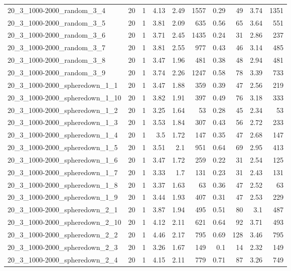 \begin{center}
\begin{scriptsize}
\begin{longtable}{lrrrrrrrrr}
20\_3\_1000-2000\_random\_3\_4 & 20 & 1 & 4.13 & 2.49 & 1557 & 0.29 & 49 & 3.74 & 1351\\
20\_3\_1000-2000\_random\_3\_5 & 20 & 1 & 3.81 & 2.09 & 635 & 0.56 & 65 & 3.64 & 551\\
20\_3\_1000-2000\_random\_3\_6 & 20 & 1 & 3.71 & 2.45 & 1435 & 0.24 & 31 & 2.86 & 237\\
20\_3\_1000-2000\_random\_3\_7 & 20 & 1 & 3.81 & 2.55 & 977 & 0.43 & 46 & 3.14 & 485\\
20\_3\_1000-2000\_random\_3\_8 & 20 & 1 & 3.47 & 1.96 & 481 & 0.38 & 48 & 2.94 & 481\\
20\_3\_1000-2000\_random\_3\_9 & 20 & 1 & 3.74 & 2.26 & 1247 & 0.58 & 78 & 3.39 & 733\\
20\_3\_1000-2000\_spheredown\_1\_1 & 20 & 1 & 3.47 & 1.88 & 359 & 0.39 & 47 & 2.56 & 219\\
20\_3\_1000-2000\_spheredown\_1\_10 & 20 & 1 & 3.82 & 1.91 & 397 & 0.49 & 76 & 3.18 & 333\\
20\_3\_1000-2000\_spheredown\_1\_2 & 20 & 1 & 3.25 & 1.64 & 53 & 0.28 & 45 & 2.34 & 53\\
20\_3\_1000-2000\_spheredown\_1\_3 & 20 & 1 & 3.53 & 1.84 & 307 & 0.43 & 56 & 2.72 & 233\\
20\_3\_1000-2000\_spheredown\_1\_4 & 20 & 1 & 3.5 & 1.72 & 147 & 0.35 & 47 & 2.68 & 147\\
20\_3\_1000-2000\_spheredown\_1\_5 & 20 & 1 & 3.51 & 2.1 & 951 & 0.64 & 69 & 2.95 & 413\\
20\_3\_1000-2000\_spheredown\_1\_6 & 20 & 1 & 3.47 & 1.72 & 259 & 0.22 & 31 & 2.54 & 125\\
20\_3\_1000-2000\_spheredown\_1\_7 & 20 & 1 & 3.33 & 1.7 & 131 & 0.23 & 31 & 2.43 & 131\\
20\_3\_1000-2000\_spheredown\_1\_8 & 20 & 1 & 3.37 & 1.63 & 63 & 0.36 & 47 & 2.52 & 63\\
20\_3\_1000-2000\_spheredown\_1\_9 & 20 & 1 & 3.44 & 1.93 & 407 & 0.31 & 47 & 2.53 & 229\\
20\_3\_1000-2000\_spheredown\_2\_1 & 20 & 1 & 3.87 & 1.94 & 495 & 0.51 & 80 & 3.1 & 487\\
20\_3\_1000-2000\_spheredown\_2\_10 & 20 & 1 & 4.12 & 2.11 & 621 & 0.64 & 92 & 3.71 & 493\\
20\_3\_1000-2000\_spheredown\_2\_2 & 20 & 1 & 4.46 & 2.17 & 795 & 0.69 & 128 & 3.46 & 795\\
20\_3\_1000-2000\_spheredown\_2\_3 & 20 & 1 & 3.26 & 1.67 & 149 & 0.1 & 14 & 2.32 & 149\\
20\_3\_1000-2000\_spheredown\_2\_4 & 20 & 1 & 4.15 & 2.11 & 779 & 0.71 & 87 & 3.26 & 749\\

\end{longtable}
\end{scriptsize}
\end{center}
